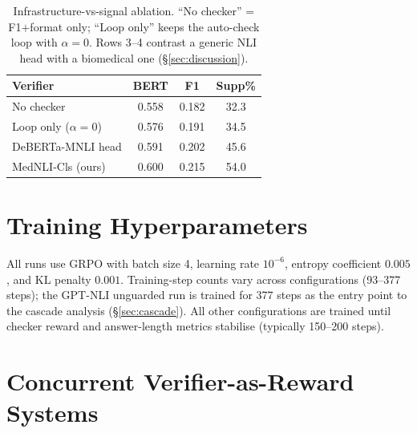 \documentclass[11pt]{article}
\begin{document}
\begin{table}[h]
\centering\small
\setlength{\tabcolsep}{4pt}
\renewcommand{\arraystretch}{1.15}
\begin{tabular}{@{}lccc@{}}
\toprule
\textbf{Verifier} & \textbf{BERT} & \textbf{F1} & \textbf{Supp\%} \\
\midrule
No checker             & 0.558 & 0.182 & 32.3 \\
Loop only ($\alpha\!=\!0$)  & 0.576 & 0.191 & 34.5 \\
DeBERTa-MNLI head      & 0.591 & 0.202 & 45.6 \\
MedNLI-Cls (ours)      & 0.600 & 0.215 & 54.0 \\
\bottomrule
\end{tabular}
\caption{Infrastructure-vs-signal ablation. ``No 
checker'' = F1$+$format only; ``Loop only'' keeps 
the auto-check loop with $\alpha\!=\!0$. Rows 3--4 
contrast a generic NLI head with a biomedical one
(\S\ref{sec:discussion}).}
\label{tab:infra_signal}
\end{table}




\section{Training Hyperparameters}
\label{app:training_hyperparams}

All runs use GRPO with batch size 4, learning rate
$10^{-6}$, entropy coefficient $0.005$, and KL
penalty $0.001$. Training-step counts vary across
configurations (93--377 steps); the GPT-NLI
unguarded run is trained for 377 steps as the
entry point to the cascade analysis
(\S\ref{sec:cascade}). All other configurations are
trained until checker reward and answer-length
metrics stabilise (typically 150--200 steps).

\section{Concurrent Verifier-as-Reward Systems}
\label{app:concurrent}
\end{document}
